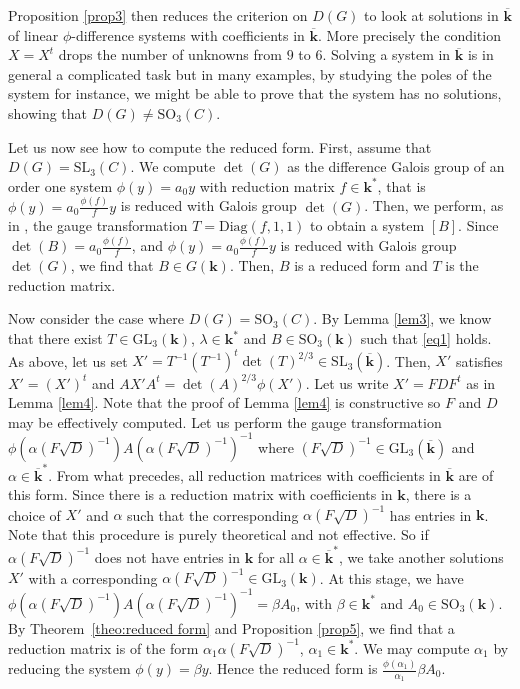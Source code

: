 \documentclass[a4paper,11pt]{amsart}
\def\k{\mathbf{k}}
\begin{document}
Proposition \ref{prop3} then reduces the criterion on $D(G)$ to look at solutions in $\overline{\mathbf{k}} $ of linear $\phi$-difference systems with coefficients in $\overline{\mathbf{k}}$. More precisely the condition $X=X^t$ drops the number of unknowns from $9$ to 
$6$.  
Solving a system in $\overline{\mathbf{k}}$ is in general a complicated task but in many examples, by studying the poles of the system for instance, we might be able to prove that the system has no solutions, showing that $D(G)\neq \mathrm{SO}_3(C)$.

Let us now see  how to compute the reduced form.  
First, assume that $D(G)=\mathrm{SL}_3 (C)$. 
We compute $\det(G)$ as the difference Galois group of an order one system $\phi(y)=a_0 y$ with reduction matrix $f\in \k^*$, that is $\phi(y)=a_0\frac{\phi(f)}{f} y$ is reduced with Galois group $\det(G)$.
Then, we perform, as in \cite[Section 4.4]{hendriks1998algorithm}, the gauge transformation  $T=\mathrm{Diag}(f,1,1)$ to obtain a system $[B]$.  Since $\det(B)=a_0\frac{\phi(f)}{f}$,   and $\phi(y)=a_0\frac{\phi(f)}{f}y$ is reduced with Galois group $\det(G)$,  we find that $B\in G(\mathbf{k})$.  Then,  $B$ is a reduced form and $T$ is the reduction matrix.   \par
Now consider the case where $D(G)= \mathrm{SO}_3(C)$. 
By Lemma \ref{lem3}, we know that there exist $T\in \mathrm{GL}_3(\k)$,  $\lambda \in \mathbf{k}^*$  and $B\in  \mathrm{SO}_3(\mathbf{k})$ such that \eqref{eq1} holds. As above, let us set $X'=T^{-1}(T^{-1})^{t}\det(T)^{2/3}\in \mathrm{SL}_3 (\overline{\mathbf{k}})$. Then, $X'$ satisfies $X'=(X')^t$ and  $A X'A^t =\det(A)^{2/3}\phi(X')$. Let us write $X'=FDF^t$ as in Lemma \ref{lem4}.   Note that the proof of Lemma \ref{lem4} is constructive so $F$ and $D$ may be effectively computed. 
Let us perform the gauge transformation  $\phi(\alpha (F\sqrt{D})^{-1})A(\alpha (F\sqrt{D})^{-1})^{-1}$ where $(F\sqrt{D})^{-1}\in \mathrm{GL}_3(\overline{\mathbf{k}})$ and $\alpha \in \overline{\mathbf{k}}^*$. From what precedes, all reduction matrices with coefficients in $\overline{\mathbf{k}}$  are of this form. Since there is a reduction matrix with coefficients in $\k$,
there is a choice of $X'$  and $\alpha$ such that the corresponding $\alpha (F\sqrt{D})^{-1}$ has entries in $\k$. Note that this procedure is purely theoretical and not effective. So if $\alpha (F\sqrt{D})^{-1}$ does not have entries in  $\mathbf{k}$ for all $\alpha \in \overline{\mathbf{k}}^*$,  we take another solutions $X'$ 
with a corresponding $\alpha (F\sqrt{D})^{-1}\in \mathrm{GL}_3(\mathbf{k})$. At this stage, we have $\phi(\alpha (F\sqrt{D})^{-1})A(\alpha  (F\sqrt{D})^{-1})^{-1}=\beta A_0$, with $\beta \in \mathbf{k}^*$  and $A_0\in \mathrm{SO}_3 (\mathbf{k})$. By Theorem~\ref{theo:reduced form} and Proposition \ref{prop5}, we find that a reduction matrix is of the form $\alpha_1 \alpha (F\sqrt{D})^{-1}$, $\alpha_1 \in \mathbf{k}^*$.  We may compute $\alpha_1$ by reducing the system $\phi (y)=\beta y$. Hence the reduced form is $\frac{\phi (\alpha_1)}{\alpha_1}\beta A_0$.
\end{document}
